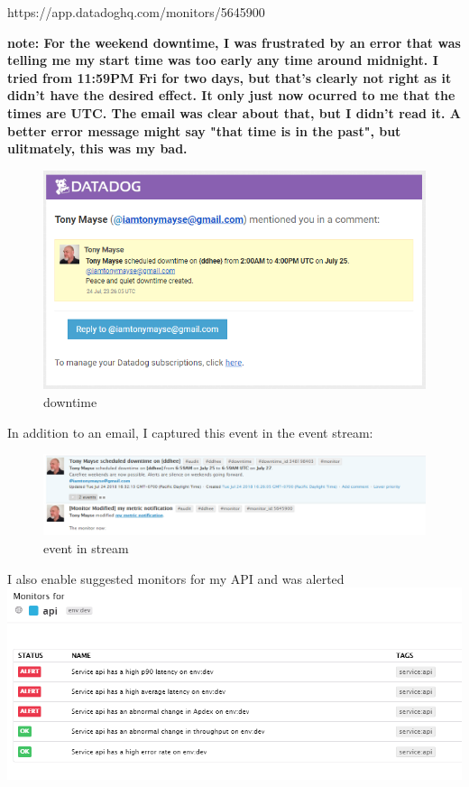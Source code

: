 \documentclass[11pt]{article}
\makeatletter
\def\maxwidth{\ifdim\Gin@nat@width>\linewidth\linewidth
    \else\Gin@nat@width\fi}
\let\Oldincludegraphics\includegraphics
\renewcommand{\includegraphics}[1]{\Oldincludegraphics[width=.8\maxwidth]{#1}}
\makeatother
\begin{document}
https://app.datadoghq.com/monitors/5645900

\textbf{note: For the weekend downtime, I was frustrated by an error
that was telling me my start time was too early any time around
midnight. I tried from 11:59PM Fri for two days, but that's clearly not
right as it didn't have the desired effect. It only just now ocurred to
me that the times are UTC. The email was clear about that, but I didn't
read it. A better error message might say "that time is in the past",
but ulitmately, this was my bad.}

\begin{figure}
\centering
\includegraphics{images/schedtime.png}
\caption{downtime}
\end{figure}

In addition to an email, I captured this event in the event stream:

\begin{figure}
\centering
\includegraphics{images/notif.png}
\caption{event in stream}
\end{figure}

I also enable suggested monitors for my API and was alerted
\includegraphics{images/hammer.png}
\end{document}
